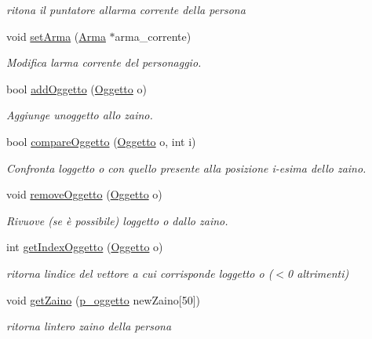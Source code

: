 \begin{DoxyCompactItemize}
\begin{DoxyCompactList}\small\item\em ritona il puntatore all\textquotesingle{}arma corrente della persona \end{DoxyCompactList}\item 
void \hyperlink{classPersona_a60a40a075ceb82c3a5586c589478abe4}{set\+Arma} (\hyperlink{classArma}{Arma} $\ast$arma\+\_\+corrente)
\begin{DoxyCompactList}\small\item\em Modifica l\textquotesingle{}arma corrente del personaggio. \end{DoxyCompactList}\item 
bool \hyperlink{classPersona_a9d2d465914d3fc2e4594cebc4fc3cfb8}{add\+Oggetto} (\hyperlink{structOggetto}{Oggetto} o)
\begin{DoxyCompactList}\small\item\em Aggiunge un\textquotesingle{}oggetto allo zaino. \end{DoxyCompactList}\item 
bool \hyperlink{classPersona_a295caef7835d4a9f631fc5bb21c57ad3}{compare\+Oggetto} (\hyperlink{structOggetto}{Oggetto} o, int i)
\begin{DoxyCompactList}\small\item\em Confronta l\textquotesingle{}oggetto o con quello presente alla posizione i-\/esima dello zaino. \end{DoxyCompactList}\item 
void \hyperlink{classPersona_a8419f8c494f1b626dcde55f1f0bb1f2e}{remove\+Oggetto} (\hyperlink{structOggetto}{Oggetto} o)
\begin{DoxyCompactList}\small\item\em Rivuove (se è possibile) l\textquotesingle{}oggetto o dallo zaino. \end{DoxyCompactList}\item 
int \hyperlink{classPersona_a8ebd8537b8a1877799829c3d7a3242d3}{get\+Index\+Oggetto} (\hyperlink{structOggetto}{Oggetto} o)
\begin{DoxyCompactList}\small\item\em ritorna l\textquotesingle{}indice del vettore a cui corrisponde l\textquotesingle{}oggetto o ($<$0 altrimenti) \end{DoxyCompactList}\item 
void \hyperlink{classPersona_adce1ee94dc798acffb6a2bbd72c70226}{get\+Zaino} (\hyperlink{structOggetto}{p\+\_\+oggetto} new\+Zaino\mbox{[}50\mbox{]})
\begin{DoxyCompactList}\small\item\em ritorna l\textquotesingle{}intero zaino della persona \end{DoxyCompactList}\item 

\end{DoxyCompactItemize}

